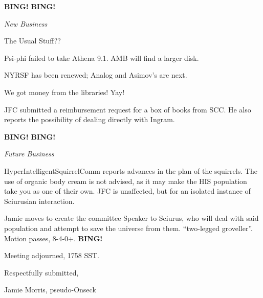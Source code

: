 \documentclass[12pt]{article}
\newcommand{\bing}{{\bf BING!} }
\newcommand{\goto}[1]{\bing \vskip 12pt \centerline{{\em{#1}}}}
\begin{document}
\bing \goto{New Business} {The Usual Stuff}??

Psi-phi failed to take Athena 9.1.  AMB will find a larger disk.

NYRSF has been renewed; Analog and Asimov's are next.

We got money from the libraries!  Yay!

JFC submitted a reimbursement request for a box of books from SCC.  He
also reports the possibility of dealing directly with Ingram.

\bing \goto{Future Business}

HyperIntelligentSquirrelComm reports advances in the plan of the
squirrels.  The use of organic body cream is not advised, as it may make
the HIS population take you as one of their own.  JFC is unaffected, but
for an isolated instance of Sciurusian interaction.

Jamie moves to create the committee Speaker to Sciurus, who will deal
with said population and attempt to save the universe from them.
``two-legged groveller''.  Motion passes, 8-4-0+. \bing

\vspace{12pt}

\noindent
Meeting adjourned, 1758 SST.

\vspace{18pt}

\centerline{Respectfully submitted,}
\centerline{Jamie Morris, pseudo-Onseck}
\end{document}
